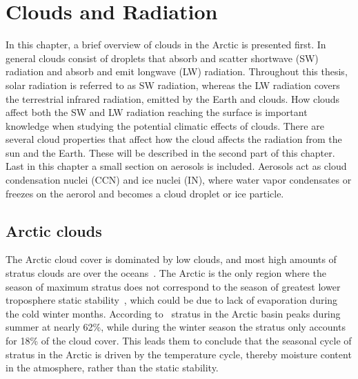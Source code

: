 \chapter{Clouds and Radiation}%
\label{chap:theory}
In this chapter, a brief overview of clouds in the Arctic is presented first. In general clouds consist of droplets that absorb and scatter shortwave (SW) radiation and absorb and emit longwave (LW) radiation. Throughout this thesis, solar radiation is referred to as SW radiation, whereas the LW radiation covers the terrestrial infrared radiation, emitted by the Earth and clouds. How clouds affect both the SW and LW radiation reaching the surface is important knowledge when studying the potential climatic effects of clouds. There are several cloud properties that affect how the cloud affects the radiation from the sun and the Earth. These will be described in the second part of this chapter. Last in this chapter a small section on aerosols is included. Aerosols act as cloud condensation nuclei (CCN) and ice nuclei (IN), where water vapor condensates or freezes on the aerorol and becomes a cloud droplet or ice particle.

\section{Arctic clouds}
The Arctic cloud cover is dominated by low clouds, and most high amounts of stratus clouds are over the oceans~\citep{Klein1993}. The Arctic is the only region where the season of maximum stratus does not correspond to the season of greatest lower troposphere static stability~\citep{Klein1993}, which could be due to lack of evaporation during the cold winter months. According to~\citet{Klein1993} stratus in the Arctic basin peaks during summer at nearly 62\%, while during the winter season the stratus only accounts for 18\% of the cloud cover. This leads them to conclude that the seasonal cycle of stratus in the Arctic is driven by the temperature cycle, thereby moisture content in the atmosphere, rather than the static stability.%

